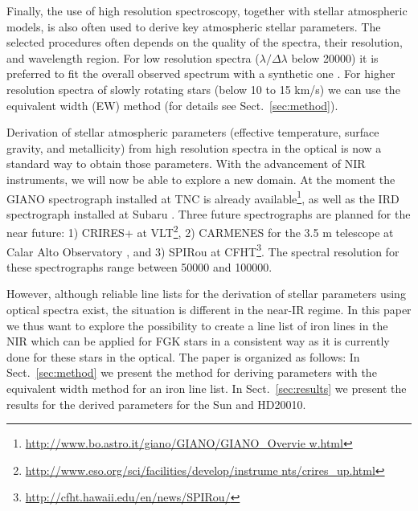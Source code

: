 \documentclass{aa}
\begin{document}
Finally, the use of high resolution spectroscopy, together with stellar
atmospheric models, is also often used to derive key atmospheric stellar
parameters. The selected procedures often depends on the quality of the
spectra, their resolution, and wavelength region. For low resolution
spectra ($\lambda/\Delta\lambda$ below 20000) it is preferred to
fit the overall observed spectrum with a synthetic one \citep[see
e.g.][]{Recio2006}. For higher resolution spectra of slowly rotating
stars (below 10 to 15 \si{km/s}) we can use the equivalent width (EW)
method (for details see Sect.~\ref{sec:method}).

Derivation of stellar atmospheric parameters (effective temperature,
surface gravity, and metallicity) from high resolution spectra in the
optical is now a standard way to obtain those parameters. With the
advancement of NIR instruments, we will now be able to explore a new
domain. At the moment the GIANO spectrograph installed at TNC is already
available\footnote{\url{http://www.bo.astro.it/giano/GIANO/GIANO_Overvie
w.html}}, as well as the IRD spectrograph installed
at Subaru \citep{IRD}. Three future spectrographs
are planned for the near future: 1) CRIRES+ at
VLT\footnote{\url{http://www.eso.org/sci/facilities/develop/instrume
nts/crires_up.html}}, 2) CARMENES for the 3.5 m telescope at
Calar Alto Observatory \citep{CARMENES}, and 3) SPIRou at
CFHT\footnote{\url{http://cfht.hawaii.edu/en/news/SPIRou/}}. The
spectral resolution for these spectrographs range between 50000 and
100000.

However, although reliable line lists for the derivation of stellar
parameters using optical spectra exist, the situation is different
in the near-IR regime. In this paper we thus want to explore the
possibility to create a line list of iron lines in the NIR which
can be applied for FGK stars in a consistent way as it is currently
done for these stars in the optical. The paper is organized as
follows: In Sect.~\ref{sec:method} we present the method for deriving
parameters with the equivalent width method for an iron line list.
In Sect.~\ref{sec:results} we present the results for the derived
parameters for the Sun and HD20010.
\end{document}
